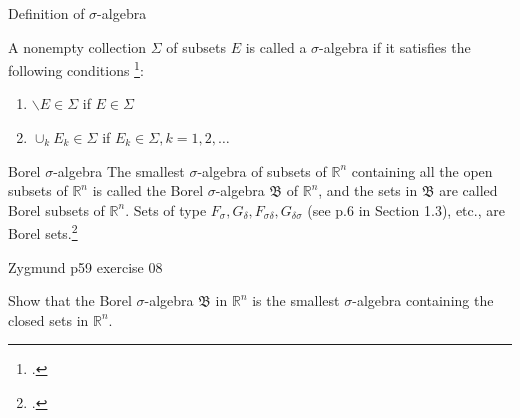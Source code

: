 \documentclass[UTF8,a4paper,10pt]{article}
\begin{document}
\begin{mybox}{Definition of \(\sigma\)-algebra}

  A nonempty collection \(\Sigma\) of subsets \(E\) is called a \(\sigma\)-algebra if it satisfies the following conditions \footcite[][49]{Wheeden_Zygmund_2015}:

  \begin{enumerate}[label=(\roman*)]
    \item \(\backslash E \in \Sigma\) if \(E \in \Sigma\)
    \item \(\cup_k E_k \in \Sigma\) if \(E_k \in \Sigma, k=1,2,\ldots\)
  \end{enumerate}
  

\end{mybox}
  

\begin{mybox}{Borel \(\sigma\)-algebra}
  The smallest \(\sigma\)-algebra of subsets of \(\mathbb{R}^n\) containing all the open subsets of
\(\mathbb{R}^n\) is called the Borel \(\sigma\)-algebra \(\mathfrak{B}\) of \(\mathbb{R}^n\), and the sets in \(\mathfrak{B}\) are called Borel subsets of \(\mathbb{R}^n\). Sets of type \(F_\sigma, G_\delta, F_{\sigma\delta}, G_{\delta\sigma}\) (see p.6 in Section 1.3), etc., are Borel sets.\footcite[][49]{Wheeden_Zygmund_2015}  


\end{mybox}




  \begin{Problem}[]{Zygmund p59 exercise 08}

    Show that the Borel \(\sigma\)-algebra \(\mathfrak{B}\)  in \(\mathbb{R}^n\)  is the smallest \(\sigma\)-algebra containing the closed sets in \(\mathbb{R}^n\).
  \end{Problem}
\end{document}
